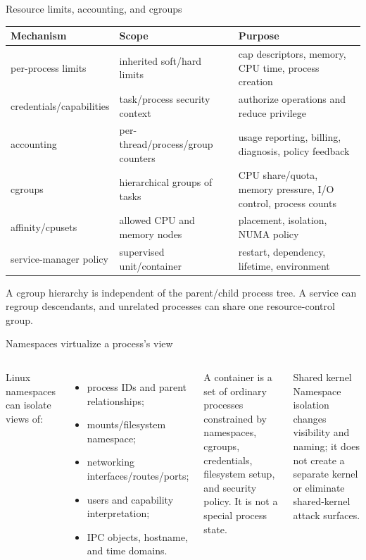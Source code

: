 \documentclass[aspectratio=169,11pt]{beamer}
\begin{document}
\begin{frame}{Resource limits, accounting, and cgroups}
  \small
  \begin{tabularx}{\textwidth}{@{}lXX@{}}
    \toprule
    \textbf{Mechanism} & \textbf{Scope} & \textbf{Purpose} \\
    \midrule
    per-process limits & inherited soft/hard limits & cap descriptors, memory, CPU time, process creation \\
    credentials/capabilities & task/process security context & authorize operations and reduce privilege \\
    accounting & per-thread/process/group counters & usage reporting, billing, diagnosis, policy feedback \\
    cgroups & hierarchical groups of tasks & CPU share/quota, memory pressure, I/O control, process counts \\
    affinity/cpusets & allowed CPU and memory nodes & placement, isolation, NUMA policy \\
    service-manager policy & supervised unit/container & restart, dependency, lifetime, environment \\
    \bottomrule
  \end{tabularx}
  \begin{tcolorbox}[title=Hierarchy distinction]
    A cgroup hierarchy is independent of the parent/child process tree. A service can regroup descendants, and unrelated processes can share one resource-control group.
  \end{tcolorbox}
\end{frame}

\begin{frame}{Namespaces virtualize a process's view}
  \begin{columns}[T,onlytextwidth]
      Linux namespaces can isolate views of:
      \begin{itemize}
        \item process IDs and parent relationships;
        \item mounts/filesystem namespace;
        \item networking interfaces/routes/ports;
        \item users and capability interpretation;
        \item IPC objects, hostname, and time domains.
      \end{itemize}
      \begin{tcolorbox}[title=Container connection]
        A container is a set of ordinary processes constrained by namespaces, cgroups, credentials, filesystem setup, and security policy. It is not a special process state.
      \end{tcolorbox}
      \begin{alertblock}{Shared kernel}
        Namespace isolation changes visibility and naming; it does not create a separate kernel or eliminate shared-kernel attack surfaces.
      \end{alertblock}
  \end{columns}
\end{frame}
\end{document}
